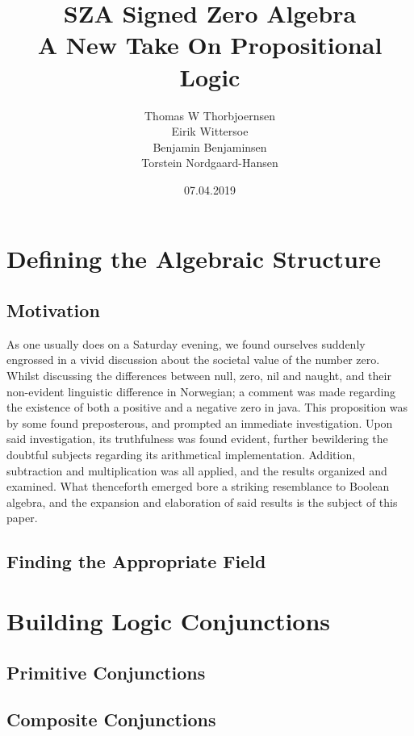 \documentclass[UTF8]{article}
\title{SZA Signed Zero Algebra \\
       \large A New Take On Propositional Logic}
\author{{Thomas W Thorbjoernsen} \\
        {Eirik Wittersoe}\\
        {Benjamin Benjaminsen}\\
        {Torstein Nordgaard-Hansen}}
\date{07.04.2019}
\begin{document}
  \maketitle
  \tableofcontents

  \newpage

  \section{Defining the Algebraic Structure}
    \subsection{Motivation}
      As one usually does on a Saturday evening, we found ourselves suddenly engrossed in a vivid discussion
      about the societal value of the number zero. Whilst discussing the differences between null, zero, nil and naught, and their non-evident
      linguistic difference in Norwegian; a comment was made regarding the existence of both a positive and a negative zero in java.
      This proposition was by some found preposterous, and prompted an immediate investigation.
      Upon said investigation, its truthfulness was found evident, further bewildering the doubtful subjects regarding its arithmetical implementation.
      Addition, subtraction and multiplication was all applied, and the results organized and examined.
      What thenceforth emerged bore a striking resemblance to Boolean algebra,
      and the expansion and elaboration of said results is the subject of this paper.

    \subsection{Finding the Appropriate Field}

  \newpage

  \section{Building Logic Conjunctions}
    \subsection{Primitive Conjunctions}

    \subsection{Composite Conjunctions}
\end{document}
